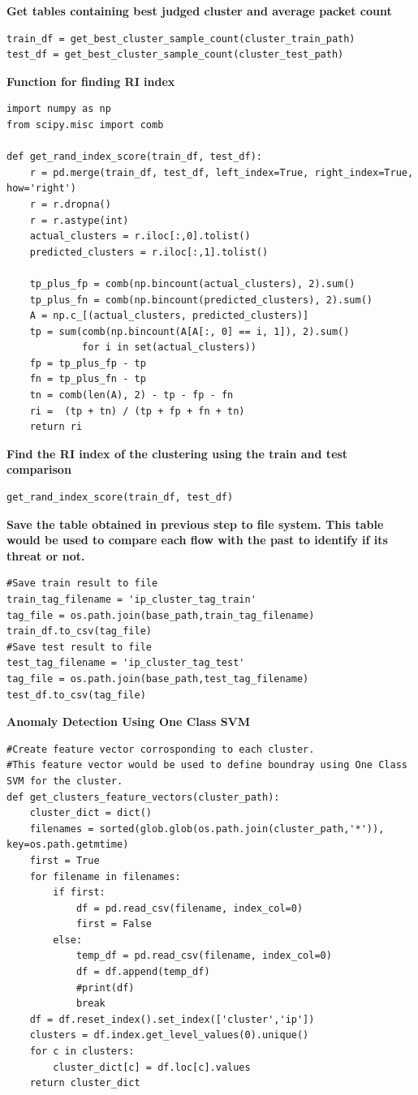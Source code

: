 \documentclass{article}
\begin{document}
\textbf{Get tables containing best judged cluster and average packet count}
\begin{verbatim}
train_df = get_best_cluster_sample_count(cluster_train_path)
test_df = get_best_cluster_sample_count(cluster_test_path)
\end{verbatim}
\textbf{\large{Function for finding RI index}}
\begin{verbatim}
import numpy as np
from scipy.misc import comb

def get_rand_index_score(train_df, test_df):
    r = pd.merge(train_df, test_df, left_index=True, right_index=True, how='right')
    r = r.dropna()
    r = r.astype(int)
    actual_clusters = r.iloc[:,0].tolist()
    predicted_clusters = r.iloc[:,1].tolist()

    tp_plus_fp = comb(np.bincount(actual_clusters), 2).sum()
    tp_plus_fn = comb(np.bincount(predicted_clusters), 2).sum()
    A = np.c_[(actual_clusters, predicted_clusters)]
    tp = sum(comb(np.bincount(A[A[:, 0] == i, 1]), 2).sum()
             for i in set(actual_clusters))
    fp = tp_plus_fp - tp
    fn = tp_plus_fn - tp
    tn = comb(len(A), 2) - tp - fp - fn
    ri =  (tp + tn) / (tp + fp + fn + tn)
    return ri
\end{verbatim}
\textbf{Find the RI index of the clustering using the train and test comparison}
\begin{verbatim}
get_rand_index_score(train_df, test_df)
\end{verbatim}
\textbf{Save the table obtained in previous step to file system.
This table would be used to compare each flow with the past to identify if its threat or not.}
\begin{verbatim}
#Save train result to file
train_tag_filename = 'ip_cluster_tag_train'
tag_file = os.path.join(base_path,train_tag_filename)
train_df.to_csv(tag_file)
#Save test result to file
test_tag_filename = 'ip_cluster_tag_test'
tag_file = os.path.join(base_path,test_tag_filename)
test_df.to_csv(tag_file)
\end{verbatim}
\pagebreak
\textbf{\Large{Anomaly Detection Using One Class SVM}}
\begin{verbatim}
#Create feature vector corrosponding to each cluster.
#This feature vector would be used to define boundray using One Class SVM for the cluster.
def get_clusters_feature_vectors(cluster_path):
    cluster_dict = dict()
    filenames = sorted(glob.glob(os.path.join(cluster_path,'*')),  key=os.path.getmtime)
    first = True
    for filename in filenames:
        if first:
            df = pd.read_csv(filename, index_col=0)
            first = False
        else:
            temp_df = pd.read_csv(filename, index_col=0)
            df = df.append(temp_df)
            #print(df)
            break
    df = df.reset_index().set_index(['cluster','ip'])
    clusters = df.index.get_level_values(0).unique()
    for c in clusters:
        cluster_dict[c] = df.loc[c].values
    return cluster_dict
\end{verbatim}
\end{document}
